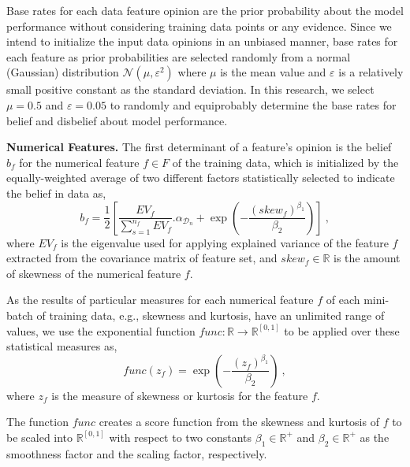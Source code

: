 {\color{blue}Base rates for each data feature opinion are the prior probability about the model performance without considering training data points or any evidence.} Since we intend to initialize the input data opinions in an unbiased manner, base rates for each feature as prior probabilities are selected randomly from a normal (Gaussian) distribution $\mathcal{N}(\mu,{\varepsilon}^2)$ where $\mu$ is the mean value and $\varepsilon$ is a relatively small positive constant as the standard deviation. In this research, we select $\mu=0.5$ and $\varepsilon=0.05$ to randomly and equiprobably determine the base rates for belief and disbelief about model performance. 

\vspace{2mm}
\noindent
\textbf{Numerical Features.}
The first determinant of a feature's opinion is the belief $b_{f}$ for the numerical feature $f \in F$ of the training data, which is initialized by the equally-weighted average of two different factors statistically selected to indicate the belief in data as, 
\begin{equation} %
    b_{f} = \frac{1}{2}[\frac{{EV}_{f}}{\sum_{s=1}^{n_f} {EV}_{f}}.{\alpha}_{\mathcal{D}_n} + \exp(-\frac{({skew}_{f})^{\beta_1}}{\beta_2})]\ ,
\label{num_b}    
\end{equation}
where ${EV}_{f}$ is the eigenvalue used for applying explained variance of the feature $f$ extracted from the covariance matrix of feature set, and ${skew}_{f} \in \mathbb{R}$ is the amount of skewness of the numerical feature $f$. 

{\color{blue} As the results of particular measures for each numerical feature $f$ of each mini-batch of training data, e.g., skewness and kurtosis, have an unlimited range of values, we use the exponential function $func: \mathbb{R} \rightarrow \mathbb{R}^{[0,1]}$ to be applied over these statistical measures as,
\begin{equation}
func(z_f)=\exp(-\frac{(z_f)^{\beta_1}}{\beta_2})\ ,
\end{equation}
where $z_f$ is the measure of skewness or kurtosis for the feature $f$.

The function $func$ creates a score function from the skewness and kurtosis of $f$ to be scaled into $\mathbb{R}^{[0,1]}$ with respect to two constants ${\beta}_1 \in \mathbb{R}^+$ and ${\beta}_2 \in \mathbb{R}^+$ as the smoothness factor and the scaling factor, respectively.}

